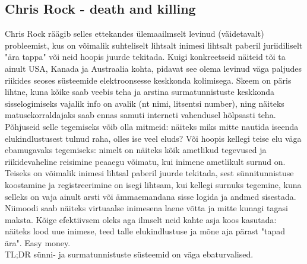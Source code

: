 \documentclass{article}
\begin{document}
\begin{enumerate}
\section{Chris Rock - death and killing}
Chris Rock räägib selles ettekandes ülemaailmselt levinud (väidetavalt) probleemist, 
kus on võimalik suhteliselt lihtsalt inimesi lihtsalt paberil juriidiliselt "ära tappa" või neid hoopis juurde tekitada. 
Kuigi konkreetseid näiteid tõi ta ainult USA, Kanada ja Austraalia kohta, pidavat see olema levinud väga paljudes riikides 
seoses süsteemide elektroonsesse keskkonda kolimisega. Skeem on päris lihtne, kuna kõike saab veebis teha ja 
arstina surmatunnistuste keskkonda sisselogimiseks vajalik info on avalik (nt nimi, litsentsi number), ning näiteks 
matusekorraldajaks saab ennas samuti interneti vahendusel hõlpsasti teha. Põhjuseid selle tegemiseks võib olla mitmeid: 
näiteks miks mitte nautida iseenda elukindlustusest tulnud raha, olles ise veel eluds? Või hoopis kellegi teise elu väga ebamugavaks 
tegemiseks: nimelt on näiteks kõik ametlikud tegevused ja riikidevaheline reisimine peaaegu võimatu, kui inimene ametlikult surnud on. 
Teiseks on võimalik inimesi lihtsal paberil juurde tekitada, sest sünnitunnistuse koostamine ja registreerimine on isegi lihtsam, 
kui kellegi surnuks tegemine, kuna selleks on vaja ainult arsti või ämmaemandana sisse logida ja andmed sisestada. 
Niimoodi saab näiteks virtuaalse inimesena laene võtta ja mitte kunagi tagasi maksta. Kõige efektiivsem oleks aga ilmselt neid kahte asja koos kasutada: 
näiteks lood uue inimese, teed talle elukindlustuse ja mõne aja pärast "tapad ära". Easy money.\\
TL;DR sünni- ja surmatunnistuste süsteemid on väga ebaturvalised.


\end{enumerate}
\end{document}
